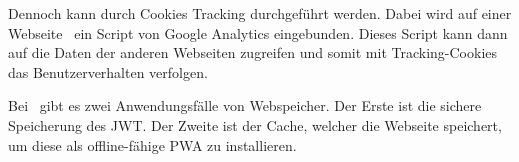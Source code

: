 Dennoch kann durch Cookies Tracking durchgeführt werden.
Dabei wird auf einer Webseite \zb\ ein Script von Google Analytics eingebunden. Dieses Script kann dann auf die Daten der anderen Webseiten zugreifen und somit mit Tracking-Cookies das Benutzerverhalten verfolgen.









Bei \ZELIA\ gibt es zwei Anwendungsfälle von Webspeicher. Der Erste ist die sichere Speicherung des JWT. Der Zweite ist der Cache, welcher die Webseite speichert, um diese als offline-fähige PWA zu installieren.

